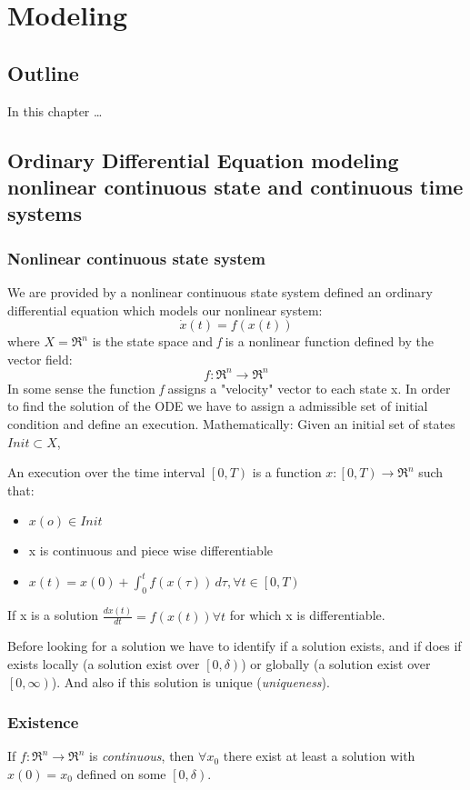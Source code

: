 \chapter{Modeling}
\section{Outline}
In this chapter \dots
\section{Ordinary Differential Equation modeling nonlinear continuous state and continuous time systems}
\subsection{Nonlinear continuous state system}
We are provided by a nonlinear continuous state system defined an ordinary differential equation which models our nonlinear system:
\[
\dot{x}(t)=f(x(t))
\]
where $X=\Re^n$ is the state space and \emph{f} is a nonlinear function defined by the vector field:
\[
f\colon\Re^n\to\Re^n
\]
In some sense the function \emph{f} assigns a "velocity" vector to each state x.
In order to find the solution of the ODE we have to assign a admissible set of initial condition and define an execution. Mathematically:
Given an initial set of states $Init \subset X$,

An execution over the time interval $\left[0,T\right)$ is a function $x\colon\left[ 0,T\right)\to \Re^n$ such that:
\begin{itemize}
	\item $x(o)\in Init$
	\item x is continuous and piece wise differentiable
	\item $x(t)=x(0)+ \int_0^t f(x(\tau))\,d\tau , \forall t \in \left[0,T\right)$
\end{itemize}

If x is a solution $\frac{dx(t)}{dt}=f(x(t)) \forall t$ for which x is differentiable.

Before looking for a solution we have to identify if a solution exists, and if does if exists locally (a solution exist over $\left[0,\delta\right)$) or globally (a solution exist over $\left[0,\infty\right)$). And also if this solution is unique (\emph{uniqueness}).

\subsection{Existence} 
\begin{thm}
	
	If $ f\colon\Re^n\to\Re^n$ is \emph{continuous}, then $\forall x_0$ there exist at least a solution with $x(0)=x_0$ defined on some $\left[0,\delta\right)$.
\end{thm}
